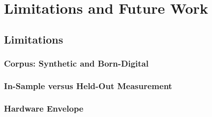 \chapter{Limitations and Future Work}
\label{ch:limitations-future-work}


\section{Limitations}
\label{sec:limitations}

\subsection{Corpus: Synthetic and Born-Digital}
\label{sec:lim-corpus}

\subsection{In-Sample versus Held-Out Measurement}
\label{sec:lim-insample}

\subsection{Hardware Envelope}
\label{sec:lim-hardware}

